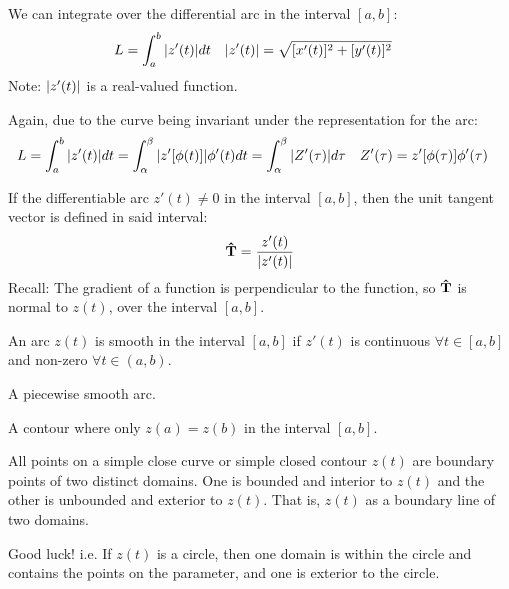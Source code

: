 \documentclass[12pt, english]{book}
\makeatletter
\renewenvironment{proof}[1][\proofname]{\par
	\pushQED{\qed}%
	\normalfont \topsep6\p@\@plus6\p@\relax
	\list{}{%
		\settowidth{\leftmargin}{\itshape\proofname:\hskip\labelsep}%
		\setlength{\labelwidth}{0pt}%
		\setlength{\itemindent}{-\leftmargin}%
		}%
	\item[\hskip\labelsep\itshape#1\@addpunct{:}]\ignorespaces
	}{\popQED\endlist\@endpefalse}
\makeatother
\begin{document}
	We can integrate over the differential arc in the interval \([a,b]\):
	\begin{align*}
		L &= \int_{a}^{b} \abs{z'(t)} dt	&	\abs{z'(t)} &= \sqrt{[x'(t)]^2 + [y'(t)]^2}
	\end{align*}
	Note: \(\abs{z'(t)}\) is a real-valued function. 
	
	Again, due to the curve being invariant under the representation for the arc:
	\begin{align*}
		L &= \int_{a}^{b} \abs{z'(t)} dt = \int_{\alpha}^{\beta} \abs{z'[\phi(t)]} \phi'(t) dt = \int_{\alpha}^{\beta} \abs{Z'(\tau)} d\tau 
			& Z'(\tau) &= z'[\phi(\tau)] \phi'(\tau)
	\end{align*} 

	If the differentiable arc \(z'(t) \neq 0\) in the interval \([a,b]\), then the unit tangent vector is defined in said interval: 
	\begin{align*}
		\vu{T} = \frac{z'(t)}{\abs{z'(t)}}
	\end{align*}
	Recall: The gradient of a function is perpendicular to the function, so \(\vu{T}\) is  normal to \(z(t)\), over the interval \([a,b]\).
	
	\begin{definition}[Smooth]
		\label{Smooth Definition - Complex}
		An arc \(z(t)\) is smooth in the interval \([a,b]\) if \(z'(t)\) is continuous \(\forall t \in [a,b]\) and non-zero \(\forall t \in (a,b)\).
	\end{definition}
	
	\begin{definition}[Contour]
		\label{Contour Definition - Complex}
		A piecewise smooth arc.
	\end{definition}

	\begin{definition}
		\label{Simple Closed Contour Definition - Complex}
		A contour where only \(z(a) = z(b)\) in the interval \([a,b]\).
	\end{definition}
	
	\begin{theorem}
		\label{Jordan Curve Theorem - Complex}
		All points on a simple close curve or simple closed contour \(z(t)\) are boundary points of two distinct domains. One is bounded and interior to \(z(t)\) and the other is unbounded and exterior to \(z(t)\).  That is, \(z(t)\) as a boundary line of two domains. 
	\end{theorem}
	\begin{proof}
		Good luck!
	\end{proof}
	i.e. If \(z(t)\) is a circle, then one domain is within the circle and contains the points on the parameter, and one is exterior to the circle.
	
\end{document}
